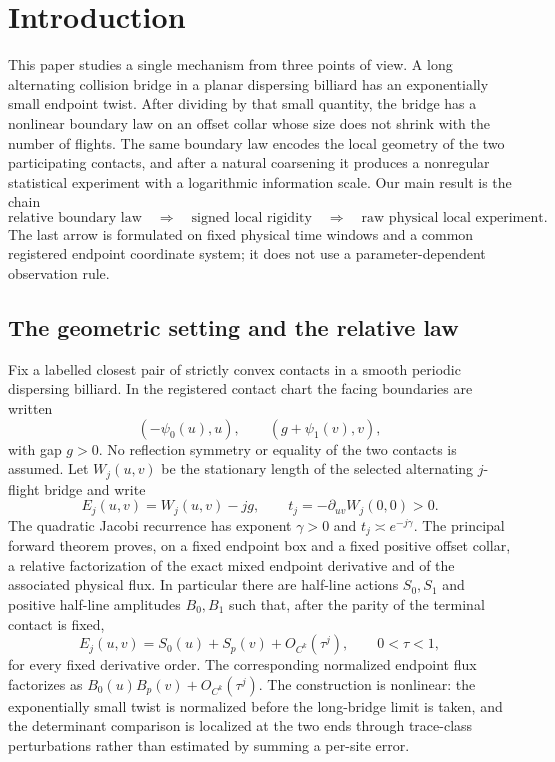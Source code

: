 \section{Introduction}
\label{sec:introduction}

This paper studies a single mechanism from three points of view.  A long
alternating collision bridge in a planar dispersing billiard has an
exponentially small endpoint twist.  After dividing by that small quantity,
the bridge has a nonlinear boundary law on an offset collar whose size does
not shrink with the number of flights.  The same boundary law encodes the
local geometry of the two participating contacts, and after a natural
coarsening it produces a nonregular statistical experiment with a logarithmic
information scale.  Our main result is the chain
\[
 \boxed{\text{relative boundary law}}
 \quad\Longrightarrow\quad
 \boxed{\text{signed local rigidity}}
 \quad\Longrightarrow\quad
 \boxed{\text{raw physical local experiment}}.
\]
The last arrow is formulated on fixed physical time windows and a common
registered endpoint coordinate system; it does not use a parameter-dependent
observation rule.

\subsection{The geometric setting and the relative law}

Fix a labelled closest pair of strictly convex contacts in a smooth periodic
dispersing billiard.  In the registered contact chart the facing boundaries
are written
\[
 (-\psi_0(u),u),\qquad (g+\psi_1(v),v),
\]
with gap $g>0$.  No reflection symmetry or equality of the two contacts is
assumed.  Let $W_j(u,v)$ be the stationary length of the selected alternating
$j$-flight bridge and write
\[
 E_j(u,v)=W_j(u,v)-jg,
 \qquad
 t_j=-\partial_{uv}W_j(0,0)>0.
\]
The quadratic Jacobi recurrence has exponent $\gamma>0$ and
$t_j\asymp e^{-j\gamma}$.  The principal forward theorem proves, on a fixed
endpoint box and a fixed positive offset collar, a relative factorization of
the exact mixed endpoint derivative and of the associated physical flux.  In
particular there are half-line actions $S_0,S_1$ and positive half-line
amplitudes $B_0,B_1$ such that, after the parity of the terminal contact is
fixed,
\[
 E_j(u,v)=S_0(u)+S_p(v)+O_{C^k}(\tau^j),
 \qquad 0<\tau<1,
\]
for every fixed derivative order.  The corresponding normalized endpoint
flux factorizes as $B_0(u)B_p(v)+O_{C^k}(\tau^j)$.  The construction is
nonlinear: the exponentially small twist is normalized before the long-bridge
limit is taken, and the determinant comparison is localized at the two ends
through trace-class perturbations rather than estimated by summing a per-site
error.

